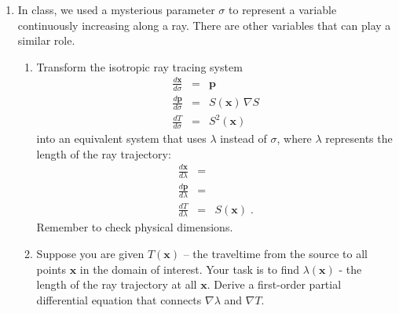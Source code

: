 \begin{enumerate}
\item In class, we used a mysterious parameter $\sigma$ to represent a
  variable continuously increasing along a ray. There are other
  variables that can play a similar role.
  \begin{enumerate}
  \item Transform the isotropic ray tracing system
    \begin{eqnarray}
      \label{eq:xsigma}
      \frac{d \mathbf{x}}{d \sigma} & = & \mathbf{p} \\
      \label{eq:psigma}
      \frac{d \mathbf{p}}{d \sigma} & = & S(\mathbf{x})\,\nabla S \\
      \label{eq:tsigma}
      \frac{d T}{d \sigma} & = & S^2(\mathbf{x})
    \end{eqnarray}
    into an equivalent system that uses $\lambda$ instead of
    $\sigma$, where $\lambda$ represents the length of the ray trajectory:
    \begin{eqnarray} 
      \label{eq:xlambda}
      \frac{d \mathbf{x}}{d \lambda} & = & \\
      \label{eq:plambda}
      \frac{d \mathbf{p}}{d \lambda} & = & \\ 
      \label{eq:tlambda}
      \frac{d T}{d \lambda} & = & S(\mathbf{x})\;.
    \end{eqnarray}
    Remember to check physical dimensions.
  \item Suppose you are given $T(\mathbf{x})$ -- the traveltime from
  the source to all points $\mathbf{x}$ in the domain of
  interest. Your task is to find $\lambda(\mathbf{x})$ - the length of
  the ray trajectory at all $\mathbf{x}$. Derive a first-order partial
  differential equation that connects $\nabla \lambda$ and $\nabla T$.
  \end{enumerate}


\end{enumerate}
